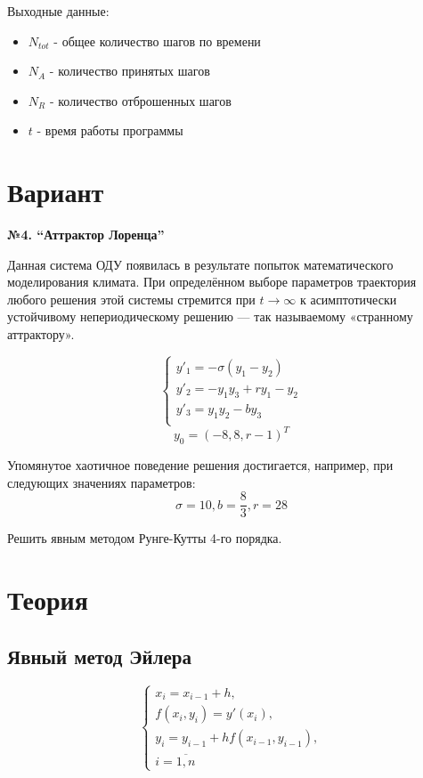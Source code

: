 \documentclass[oneside, final, 11pt]{article}
\begin{document}
Выходные данные:
\begin{itemize}
    \item $N_{tot}$ - общее количество шагов по времени
    \item $N_A$ - количество принятых шагов
    \item $N_R$ - количество отброшенных шагов
    \item $t$ - время работы программы
\end{itemize}


\section{Вариант}
\begin{center}
    \bf №4. ``Аттрактор Лоренца''
\end{center}

Данная система ОДУ появилась в результате попыток математического моделирования климата. При определённом выборе параметров траектория любого решения этой системы стремится при $t \rightarrow \infty$ к асимптотически устойчивому непериодическому решению — так называемому «странному аттрактору».

\begin{equation}
    \begin{cases}
    y'_1 = -\sigma(y_1 - y_2) \\
    y'_2 = -y_1 y_3 + r y_1 - y_2\\
    y'_3 = y_1 y_2 - b y_3 \\
    \end{cases}
\end{equation}
\begin{equation}
    y_0 = (-8,8,r-1)^T
\end{equation}

Упомянутое хаотичное поведение решения достигается, например, при следующих значениях параметров:
\begin{equation}
    \sigma = 10, b = \frac{8}{3}, r = 28
\end{equation}

Решить явным методом Рунге-Кутты 4-го порядка.

\section{Теория}

\subsection{Явный метод Эйлера}
\begin{equation}
    \begin{cases}
    x_i = x_{i-1} + h, \\
    f(x_i, y_i) = y'(x_i), \\
    y_i = y_{i-1} + h f(x_{i-1}, y_{i-1}), \\
    i=\overline{1,n}
    \end{cases}
\end{equation}
\end{document}
